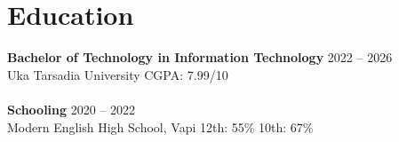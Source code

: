 \documentclass[10pt]{article}
\begin{document}
\section{Education}
\textbf{Bachelor of Technology in Information Technology} \hfill 2022 -- 2026 \\
Uka Tarsadia University \hfill CGPA: 7.99/10 \\
\\
\textbf{Schooling} \hfill 2020 -- 2022 \\
Modern English High School, Vapi \hfill 12th: 55\% \quad 10th: 67\%
\end{document}
